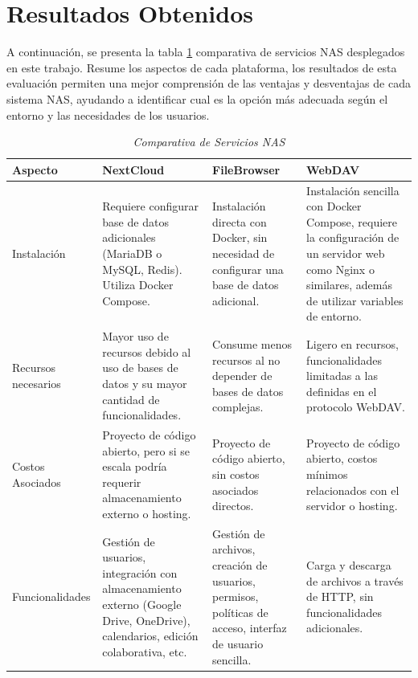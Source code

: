 \documentclass[a4paper,10pt]{article}
\begin{document}
	\section{Resultados Obtenidos}
	A continuación, se presenta la tabla \ref{tabla:comparativa_servicios} comparativa de servicios NAS desplegados en este trabajo. Resume los aspectos de cada plataforma, los resultados de esta evaluación permiten una mejor comprensión de las ventajas y desventajas de cada sistema NAS, ayudando a identificar cual es la opción más adecuada según el entorno y las necesidades de los usuarios.
	
	\begin{table}[htbp]
		\centering
		\caption{\textit{Comparativa de Servicios NAS}}
		\label{tabla:comparativa_servicios}
		\footnotesize %
		\begin{tabularx}{\textwidth}{>{\hsize=0.8\hsize}X >{\hsize=1.1\hsize}X >{\hsize=1.1\hsize}X >{\hsize=1.1\hsize}X}
			\toprule
			\textbf{Aspecto} & \textbf{NextCloud} & \textbf{FileBrowser} & \textbf{WebDAV} \\
			\midrule
			Instalación & Requiere configurar base de datos adicionales (MariaDB o MySQL, Redis). Utiliza Docker Compose. & Instalación directa con Docker, sin necesidad de configurar una base de datos adicional. & Instalación sencilla con Docker Compose, requiere la configuración de un servidor web como Nginx o similares, además de utilizar variables de entorno. \\
			\midrule
			Recursos necesarios & Mayor uso de recursos debido al uso de bases de datos y su mayor cantidad de funcionalidades. & Consume menos recursos al no depender de bases de datos complejas. & Ligero en recursos, funcionalidades limitadas a las definidas en el protocolo WebDAV. \\
			\midrule
			Costos Asociados & Proyecto de código abierto, pero si se escala podría requerir almacenamiento externo o hosting. & Proyecto de código abierto, sin costos asociados directos. & Proyecto de código abierto, costos mínimos relacionados con el servidor o hosting. \\
			\midrule
			Funcionalidades & Gestión de usuarios, integración con almacenamiento externo (Google Drive, OneDrive), calendarios, edición colaborativa, etc. & Gestión de archivos, creación de usuarios, permisos, políticas de acceso, interfaz de usuario sencilla. & Carga y descarga de archivos a través de HTTP, sin funcionalidades adicionales. \\

\end{tabularx}
\end{table}
\end{document}
